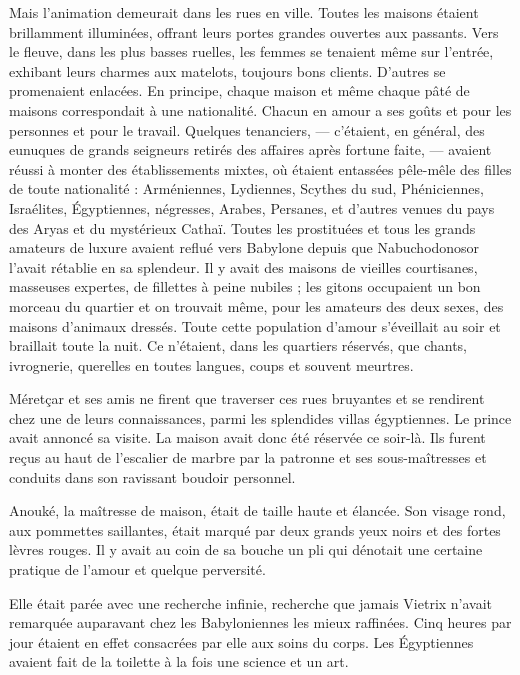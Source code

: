 \documentclass[a4paper, 11pt, oneside, polutonikogreek, french]{article}
\begin{document}
Mais l'animation demeurait dans les rues en ville. Toutes les maisons étaient brillamment illuminées, offrant leurs portes grandes ouvertes aux passants. Vers le fleuve, dans les plus basses ruelles, les femmes se tenaient même sur l'entrée, exhibant leurs charmes aux matelots, toujours bons clients. D'autres se promenaient enlacées. En principe, chaque maison et même chaque pâté de maisons correspondait à une nationalité. Chacun en amour a ses goûts et pour les personnes et pour le travail. Quelques tenanciers, --- c'étaient, en général, des eunuques de grands seigneurs retirés des affaires après fortune faite, --- avaient réussi à monter des établissements mixtes, où étaient entassées pêle-mêle des filles de toute nationalité : Arméniennes, Lydiennes, Scythes du sud, Phéniciennes, Israélites, Égyptiennes, négresses, Arabes, Persanes, et d'autres venues du pays des Aryas et du mystérieux Cathaï. Toutes les prostituées et tous les grands amateurs de luxure avaient reflué vers Babylone depuis que Nabuchodonosor l'avait rétablie en sa splendeur. Il y avait des maisons de vieilles courtisanes, masseuses expertes, de fillettes à peine nubiles ; les gitons occupaient un bon morceau du quartier et on trouvait même, pour les amateurs des deux sexes, des maisons d'animaux dressés. Toute cette population d'amour s'éveillait au soir et braillait toute la nuit. Ce n'étaient, dans les quartiers réservés, que chants, ivrognerie, querelles en toutes langues, coups et souvent meurtres.

\bigskip
\centerline{\EightStarTaper}
\centerline{\EightStarTaper\EightStarTaper}
\bigskip

Méretçar et ses amis ne firent que traverser ces rues bruyantes et se rendirent chez une de leurs connaissances, parmi les splendides villas égyptiennes. Le prince avait annoncé sa visite. La maison avait donc été réservée ce soir-là. Ils furent reçus au haut de l'escalier de marbre par la patronne et ses sous-maîtresses et conduits dans son ravissant boudoir personnel.

Anouké, la maîtresse de maison, était de taille haute et élancée. Son visage rond, aux pommettes saillantes, était marqué par deux grands yeux noirs et des fortes lèvres rouges. Il y avait au coin de sa bouche un pli qui dénotait une certaine pratique de l'amour et quelque perversité.

Elle était parée avec une recherche infinie, recherche que jamais Vietrix n'avait remarquée auparavant chez les Babyloniennes les mieux raffinées. Cinq heures par jour étaient en effet consacrées par elle aux soins du corps. Les Égyptiennes avaient fait de la toilette à la fois une science et un art.
\end{document}

